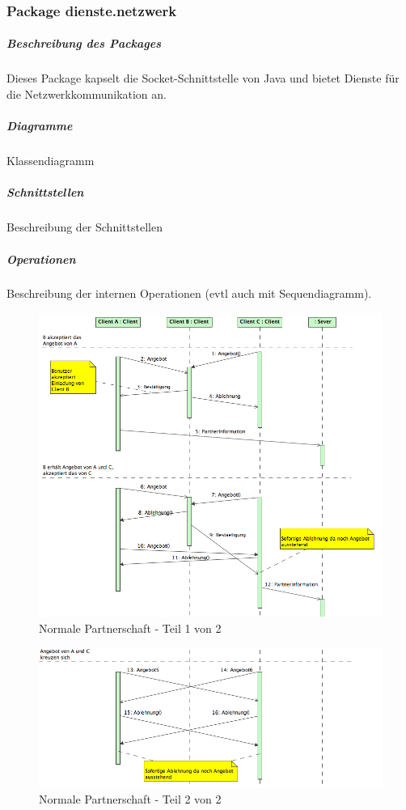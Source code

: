 \documentclass[a4paper,12pt,halfparskip,DIV14]{scrartcl}
\begin{document}
\clearpage
\subsubsection{Package dienste.netzwerk} %
\label{ssub:package_dienste_netzwerk}
\subparagraph{Beschreibung des Packages} %
\label{ssub:beschreibung_des_packages}
Dieses Package kapselt die Socket-Schnittstelle von Java und bietet Dienste für die Netzwerkkommunikation an.
\subparagraph{Diagramme} %
\label{ssub:diagramme}
Klassendiagramm
\subparagraph{Schnittstellen} %
\label{ssub:schnittstellen}
Beschreibung der Schnittstellen
\subparagraph{Operationen} %
\label{ssub:operationen}
Beschreibung der internen Operationen (evtl auch mit Sequendiagramm).
\begin{figure}
	[htp] \centering 
	\includegraphics[width=1\textwidth]{dienste_partnerschaft_normal_1.png} \caption{Normale Partnerschaft - Teil 1 von 2}\label{fig:dienste_partnerschaft_normal_1.png} 
\end{figure}
\begin{figure}
	[htp] \centering 
	\includegraphics[width=1\textwidth]{dienste_partnerschaft_normal_2.png} \caption{Normale Partnerschaft - Teil 2 von 2}\label{fig:dienste_partnerschaft_normal_2.png} 
\end{figure}
\end{document}

